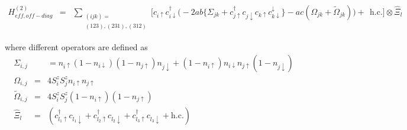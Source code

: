 \documentclass[reprint,prb,superscriptaddress]{revtex4-2}
\begin{document}
\begin{widetext}
\begin{eqnarray}
H^{(2)}_{eff,off-diag} &=& \sum_{\substack{(ijk)=\\(123),(231),(312)}}\bigg[ c_{i\uparrow}c_{i\downarrow}^{\dagger} \bigg( -2ab \bigg\{ \Sigma_{jk} +c_{j\uparrow}^{\dagger}c_{j\downarrow}c_{k\uparrow}c_{k\downarrow}^{\downarrow} \bigg\} -ac(\Omega_{jk}+\tilde{\Omega}_{jk}) \bigg) + ~~\textrm{h.c.}\bigg] \otimes \hat{\Xi}_l
\end{eqnarray}
\end{widetext}
where different operators are defined as
\begin{eqnarray}
\Sigma_{i,j} &&=n_{i\uparrow}(1-n_{i\downarrow}) (1-n_{j\uparrow})n_{j\downarrow} + (1-n_{i\uparrow})n_{i\downarrow} n_{j\uparrow} (1 -n_{j\downarrow})\nonumber\\
\Omega_{i,j} &=&4S_i^z S_j^z n_{i\uparrow} n_{j\uparrow}\nonumber\\
\tilde{\Omega}_{i,j} &=& 4S_{i}^zS_j^z (1-n_{i\uparrow})(1-n_{j\uparrow}) \nonumber\\
 \hat{\Xi}_l&=&  ( c_{l_1\uparrow}^{\dagger} c_{l_1\downarrow} +c_{l_2\uparrow}^{\dagger} c_{l_2\downarrow} + c_{l_3\uparrow}^{\dagger} c_{l_3\downarrow} + \textrm{h.c.})
\end{eqnarray}
\end{document}
